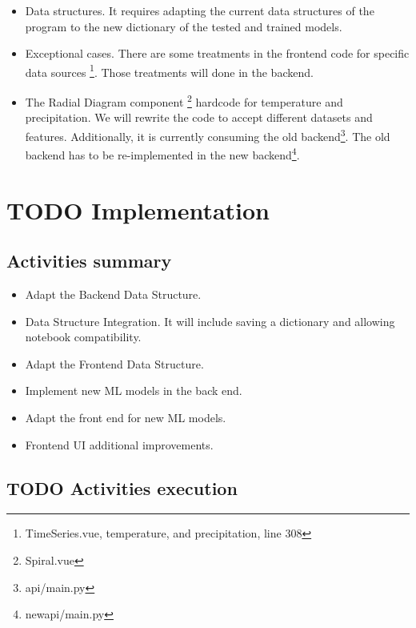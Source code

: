 \documentclass[a4paper]{article}
\begin{document}
\begin{itemize}
\item Data structures. It requires adapting the current data structures of the program to the new dictionary of the tested and trained models.

\item Exceptional cases. There are some treatments in the frontend code for specific data sources \footnote{TimeSeries.vue, temperature, and precipitation, line 308}. Those treatments will done in the backend.

\item The Radial Diagram component \footnote{Spiral.vue} hardcode for temperature and precipitation. We will rewrite the code to accept different datasets and features. Additionally, it is currently consuming the old backend\footnote{api/main.py}. The old backend has to be re-implemented in the new backend\footnote{new\textunderscore api/main.py}.
\end{itemize}

\section{{\bfseries\sffamily TODO} Implementation}
\label{sec:org8d9431a}

\subsection{Activities summary}
\label{sec:orgda1e901}

\begin{itemize}
\item Adapt the Backend Data Structure.

\item Data Structure Integration. It will include saving a dictionary and allowing notebook compatibility.

\item Adapt the Frontend Data Structure.

\item Implement new ML models in the back end.

\item Adapt the front end for new ML models.

\item Frontend UI additional improvements.
\end{itemize}

\subsection{{\bfseries\sffamily TODO} Activities execution}
\label{sec:org10996cf}
\end{document}
